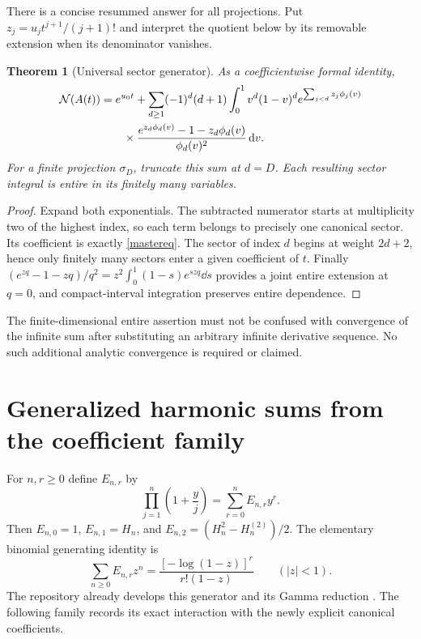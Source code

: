 \documentclass[11pt]{article}
\numberwithin{equation}{section}
\newtheorem{theorem}{Theorem}[section]
\theoremstyle{definition}\newtheorem{definition}[theorem]{Definition}
\theoremstyle{remark}\newtheorem{remark}[theorem]{Remark}
\begin{document}
There is a concise resummed answer for all projections. Put
$z_j=u_jt^{j+1}/(j+1)!$ and interpret the quotient below by its removable extension when its denominator vanishes.
\begin{theorem}[Universal sector generator]\label{allgenerator}
As a coefficientwise formal identity,
\begin{equation}\label{universalgen}
\begin{split}
 \mathcal N(A(t))&=e^{u_0t}+\sum_{d\ge1}(-1)^d(d+1)\int_0^1 v^d(1-v)^d e^{\sum_{j<d}z_j\phi_j(v)}\\
 &\qquad\times\frac{e^{z_d\phi_d(v)}-1-z_d\phi_d(v)}{\phi_d(v)^2}\,\mathrm d v.
\end{split}
\end{equation}
For a finite projection $\sigma_D$, truncate this sum at $d=D$. Each resulting sector integral is entire in its finitely many variables.
\end{theorem}
\begin{proof}
Expand both exponentials. The subtracted numerator starts at multiplicity two of the highest index, so each term belongs to precisely one canonical sector. Its coefficient is exactly \eqref{mastereq}. The sector of index $d$ begins at weight $2d+2$, hence only finitely many sectors enter a given coefficient of $t$. Finally
$(e^{zq}-1-zq)/q^2=z^2\int_0^1(1-s)e^{szq}\dd s$
provides a joint entire extension at $q=0$, and compact-interval integration preserves entire dependence.
\end{proof}
The finite-dimensional entire assertion must not be confused with convergence of the infinite sum after substituting an arbitrary infinite derivative sequence. No such additional analytic convergence is required or claimed.

\section{Generalized harmonic sums from the coefficient family}
For $n,r\ge0$ define $E_{n,r}$ by
\[
 \prod_{j=1}^n\left(1+\frac yj\right)=\sum_{r=0}^nE_{n,r}y^r.
\]
Then $E_{n,0}=1$, $E_{n,1}=H_n$, and
$E_{n,2}=(H_n^2-H_n^{(2)})/2$. The elementary binomial generating identity is
\begin{equation}\label{eharmonic}
 \sum_{n\ge0}E_{n,r}z^n
 =\frac{[-\log(1-z)]^r}{r!(1-z)}\qquad(|z|<1).
\end{equation}
The repository already develops this generator and its Gamma reduction \cite{harmonic}. The following family records its exact interaction with the newly explicit canonical coefficients.
\end{document}
